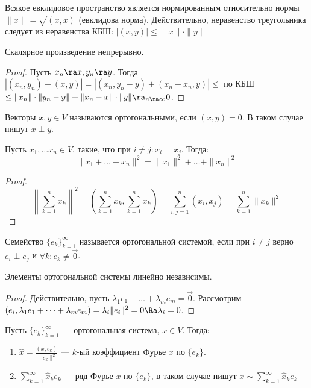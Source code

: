 \begin{note}
    Всякое евклидовое пространство является нормированным относительно нормы \(\|x\| = \sqrt{(x, x)}\) (евклидова норма). Действительно, неравенство треугольника следует из неравенства КБШ: \(|(x, y)| \le \|x\|\cdot\|y\|\)
\end{note}

\begin{note}
    Скалярное произведение непрерывно.
\end{note}
\begin{proof}
    Пусть \(x_n \ra x, y_n \ra y\). Тогда \(|(x_n, y_n) - (x, y)| = |(x_n, y_n - y) + (x_n - x_n, y)| \le\) по КБШ \(\le \|x_n\|\cdot\|y_n - y\| + \|x_n - x\|\cdot\|y\| \ra_{n \ra \infty} 0\).
\end{proof}

\begin{definition}
    Векторы \(x, y \in V\) называются ортогональными, если \((x, y) = 0\). В таком случае пишут \(x \perp y\).
\end{definition}

\begin{lemma}
    Пусть \(x_1, \dots x_n \in V\), такие, что при \(i \ne j: x_i \perp x_j\). Тогда:
    \[\|x_1 + \dots + x_n\|^2 = \|x_1\|^2 + \dots + \|x_n\|^2\]
\end{lemma}
\begin{proof}
    \[\left\|\sum_{k = 1}^n x_k\right\|^2 = \left( \sum_{k = 1}^n x_k, \sum_{k = 1}^n x_k \right) = \sum_{i, j = 1}^n (x_i, x_j) = \sum_{k = 1}^n \|x_k\|^2\]
\end{proof}

\begin{definition}
    Семейство \(\{e_k\}_{k = 1}^\infty\) называется ортогональной системой, если при \(i \ne j\) верно \(e_i \perp e_j\) и \(\forall k: e_k \ne \vec{0}\).
\end{definition}

\begin{note}
    Элементы ортогональной системы линейно независимы.
\end{note}
\begin{proof}
    Действительно, пусть \(\lambda_1e_1 + \dots + \lambda_me_m = \vec{0}\). Рассмотрим \((e_i, \lambda_1e_1 + \dots + \lambda_me_m) = \lambda_i\|e_i\|^2 = 0 \Ra \lambda_i = 0\).
\end{proof}

\begin{definition}
    Пусть \(\{e_k\}_{k = 1}^\infty\) --- ортогональная система, \(x \in V\). Тогда:
    \begin{enumerate}
        \item \(\widehat{x} = \frac{(x, e_k)}{\|e_k\|^2}\) --- \(k\)-ый коэффициент Фурье \(x\) по \(\{e_k\}\).
        \item \(\sum_{k = 1}^\infty \widehat{x}_ke_k\) --- ряд Фурье \(x\) по \(\{e_k\}\), в таком случае пишут \(x \sim \sum_{k = 1}^\infty \widehat{x}_ke_k\)
    \end{enumerate}
\end{definition}

